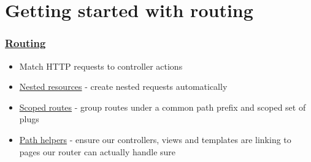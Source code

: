 \section{Getting started with routing}

\frame{\tableofcontents[currentsection]}

\begin{frame}
    \frametitle{\href{https://devhints.io/phoenix-routing}{Routing}}

    \begin{itemize}
        \item Match HTTP requests to controller actions
        \item \href{https://hexdocs.pm/phoenix/routing.html\#nested-resources}{Nested resources} - create nested requests automatically
        \item \href{https://hexdocs.pm/phoenix/routing.html\#scoped-routes}{Scoped routes} - group routes under a common path prefix and scoped set of plugs
        \item \href{https://hexdocs.pm/phoenix/routing.html\#path-helpers}{Path helpers} - ensure our controllers, views and templates are linking to pages our router can actually handle sure
    \end{itemize}
\end{frame}


